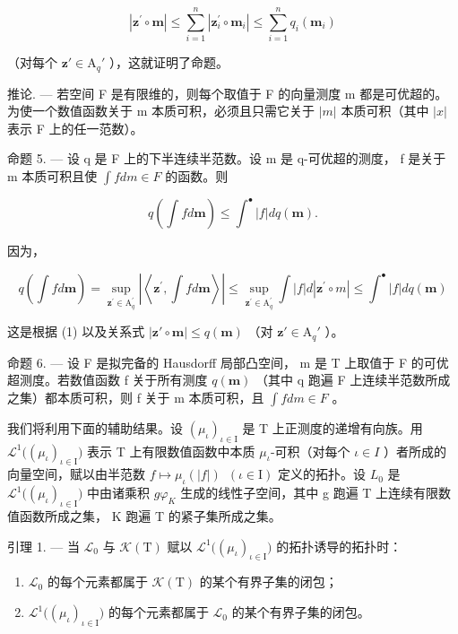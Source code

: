 \[
\left| \mathbf {z} ^ {\prime} \circ \mathbf {m} \right| \leqslant \sum_ {i = 1} ^ {n} \left| \mathbf {z} _ {i} ^ {\prime} \circ \mathbf {m} _ {i} \right| \leqslant \sum_ {i = 1} ^ {n} q _ {i} (\mathbf {m} _ {i})
\]

（对每个 \(\mathbf{z}' \in \mathrm{A}_q'\) ），这就证明了命题。

推论. --- 若空间 F 是有限维的，则每个取值于 F 的向量测度 m 都是可优超的。为使一个数值函数关于 m 本质可积，必须且只需它关于 \(|m|\) 本质可积（其中 \(|x|\) 表示 F 上的任一范数）。

命题 5. --- 设 q 是 F 上的下半连续半范数。设 m 是 q-可优超的测度， f 是关于 m 本质可积且使 \(\int f dm \in F\) 的函数。则

\[
q \left(\int f d \mathbf {m}\right) \leqslant \int^ {\bullet} | f | d q (\mathbf {m}).
\]

因为，

\[
q \left(\int f d \mathbf {m}\right) = \sup _ {\mathbf {z} ^ {\prime} \in \mathrm{A} _ {q} ^ {\prime}} \left| \left\langle \mathbf {z} ^ {\prime}, \int f d \mathbf {m} \right\rangle \right| \leqslant \sup _ {\mathbf {z} ^ {\prime} \in \mathrm{A} _ {q} ^ {\prime}} \int | f | d | \mathbf {z} ^ {\prime} \circ m | \leqslant \int^ {\bullet} | f | d q (\mathbf {m})
\]

这是根据 (1) 以及关系式 \(|\mathbf{z}' \circ \mathbf{m}| \leqslant q(\mathbf{m})\) （对 \(\mathbf{z}' \in \mathrm{A}_q'\) ）。

命题 6. --- 设 F 是拟完备的 Hausdorff 局部凸空间， m 是 T 上取值于 F 的可优超测度。若数值函数 f 关于所有测度 \(q(\mathbf{m})\) （其中 q 跑遍 F 上连续半范数所成之集）都本质可积，则 f 关于 m 本质可积，且 \(\int f dm \in F\) 。

我们将利用下面的辅助结果。设 \((\mu_{\iota})_{\iota\in\mathrm{I}}\) 是 T 上正测度的递增有向族。用 \(\mathcal{L}^{1}\big((\mu_{\iota})_{\iota\in\mathrm{I}}\big)\) 表示 T 上有限数值函数中本质 \(\mu_{\iota}\)-可积（对每个 \(\iota\in I\) ）者所成的向量空间，赋以由半范数 \(f\mapsto\mu_{\iota}(|f|)\;\ (\iota\in\mathrm{I})\) 定义的拓扑。设 \(L_{0}\) 是 \(\mathcal{L}^{1}\big((\mu_{\iota})_{\iota\in\mathrm{I}}\big)\) 中由诸乘积 \(g\varphi_{K}\) 生成的线性子空间，其中 g 跑遍 T 上连续有限数值函数所成之集， K 跑遍 T 的紧子集所成之集。

引理 1. --- 当 \(\mathcal{L}_0\) 与 \(\mathcal{K}(\mathrm{T})\) 赋以 \(\mathcal{L}^1\big((\mu_\iota)_{\iota \in \mathrm{I}}\big)\) 的拓扑诱导的拓扑时：

\begin{enumerate}
\def\labelenumi{\alph{enumi})}
\item
  \(\mathcal{L}_0\) 的每个元素都属于 \(\mathcal{K}(\mathrm{T})\) 的某个有界子集的闭包；
\item
  \(\mathcal{L}^1\big((\mu_\iota)_{\iota \in \mathrm{I}}\big)\) 的每个元素都属于 \(\mathcal{L}_0\) 的某个有界子集的闭包。
\end{enumerate}

